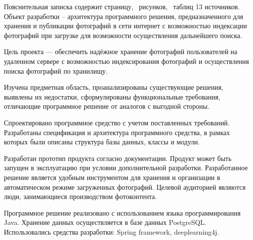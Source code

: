 
Пояснительная записка содержит \pageref{LastPage} страницу, \totfig\ рисунков, \tottab\ таблиц 13 источников.
Объект разработки – архитектура программного решения, предназначенного для хранения и публикации фотографий в сети интернет с возможностью индексации фотографий при загрузке для возможности осуществления дальнейшего поиска.

Цель проекта — обеспечить надёжное хранение фотографий пользователей на удаленном сервере с возможностью индексирования фотографий и осуществления поиска фотографий по хранилищу. 

Изучена предметная область, проанализированы существующие решения, выявлены их недостатки, сформулированы функциональные требования, отличающие программное решение от аналогов с выгодной стороны.

Спроектировано программное средство с учетом поставленных требований.
Разработаны спецификация и архитектура программного средства, в рамках которых были описаны структура базы данных, классы и модули.

Разработан прототип продукта согласно документации. 
Продукт может быть запущен в эксплуатацию при условии дополнительной разработки.
Разработанное решение является удобным инструментом для хранения и организации в автоматическом режиме загруженных фотографий.
Целевой аудиторией являются люди, занимающиеся производством фотоконтента.

Программное решение реализовано с использованием языка программирования Java. Хранение данных осуществляется в базе данных PostgreSQL. Использовались средства разработки: Spring framework, deeplearning4j.

\clearpage